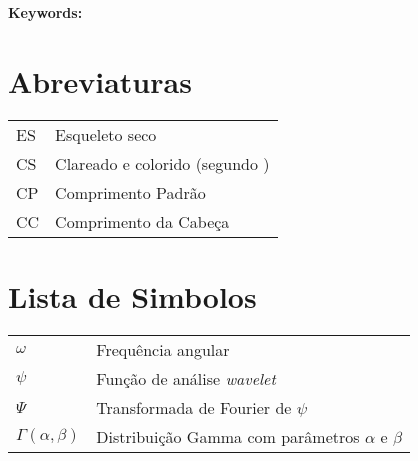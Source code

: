 \documentclass[12pt,twoside,a4paper]{book}
\begin{document}
\noindent \textbf{Keywords:} 

\tableofcontents    %

\chapter{Abreviaturas}
\begin{tabular}{ll}
         ES         & Esqueleto seco\\
         CS         & Clareado e colorido (segundo \citet{Provete2012})\\
         CP         & Comprimento Padrão\\
         CC         & Comprimento da Cabeça\\
\end{tabular}

\chapter{Lista de Simbolos}
\begin{tabular}{ll}
        $\omega$                & Frequência angular\\
        $\psi$                  & Função de análise \emph{wavelet}\\
        $\Psi$                  & Transformada de Fourier de $\psi$\\
        $\Gamma(\alpha,\beta)$  & Distribuição Gamma com parâmetros $\alpha$ e $\beta$ \\
\end{tabular}

\listoffigures            
\listoftables            

\mainmatter

\fancyhead[RE,LO]{\thesection}

\singlespacing              %

\end{document}
